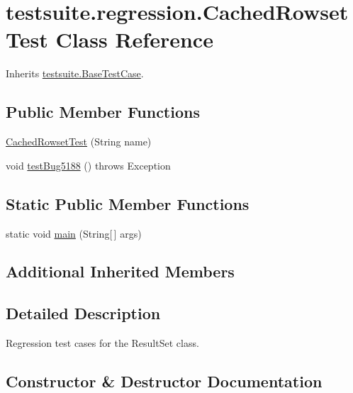 \hypertarget{classtestsuite_1_1regression_1_1_cached_rowset_test}{}\section{testsuite.\+regression.\+Cached\+Rowset\+Test Class Reference}
\label{classtestsuite_1_1regression_1_1_cached_rowset_test}


Inherits \mbox{\hyperlink{classtestsuite_1_1_base_test_case}{testsuite.\+Base\+Test\+Case}}.

\subsection*{Public Member Functions}
\begin{DoxyCompactItemize}
\item 
\mbox{\hyperlink{classtestsuite_1_1regression_1_1_cached_rowset_test_a928cdd9b59eb0bbfcc9e8332f935624e}{Cached\+Rowset\+Test}} (String name)
\item 
void \mbox{\hyperlink{classtestsuite_1_1regression_1_1_cached_rowset_test_a463f914f431e564bd1e4fe42de779037}{test\+Bug5188}} ()  throws Exception 
\end{DoxyCompactItemize}
\subsection*{Static Public Member Functions}
\begin{DoxyCompactItemize}
\item 
static void \mbox{\hyperlink{classtestsuite_1_1regression_1_1_cached_rowset_test_a66de4a98e7241932f80981d0efa979be}{main}} (String\mbox{[}$\,$\mbox{]} args)
\end{DoxyCompactItemize}
\subsection*{Additional Inherited Members}


\subsection{Detailed Description}
Regression test cases for the Result\+Set class. 

\subsection{Constructor \& Destructor Documentation}
\mbox{\label{classtestsuite_1_1regression_1_1_cached_rowset_test_a928cdd9b59eb0bbfcc9e8332f935624e}} 
